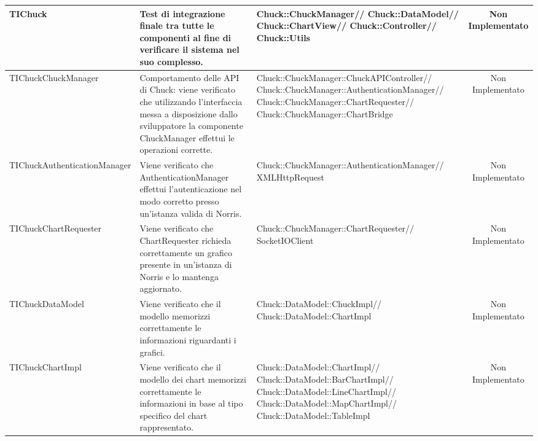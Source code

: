 \begin{table}[H]
\begin{center}
\begin{tabu}{| l | l | l | c |}


	TIChuck
				&
Test di integrazione finale tra tutte le componenti al fine di verificare il sistema nel suo complesso.
			& \parbox[t]{0.4\textwidth}{
Chuck::ChuckManager//
Chuck::DataModel//
Chuck::ChartView//
Chuck::Controller//
Chuck::Utils}
			& Non Implementato
			\\ \hline



	TIChuckChuckManager
				&
Comportamento delle API di Chuck: viene verificato che utilizzando l'interfaccia messa a disposizione dallo sviluppatore la componente ChuckManager effettui le operazioni corrette.
			& \parbox[t]{0.4\textwidth}{
Chuck::ChuckManager::ChuckAPIController//
Chuck::ChuckManager::AuthenticationManager//
Chuck::ChuckManager::ChartRequester//
Chuck::ChuckManager::ChartBridge}
			& Non Implementato
			\\ \hline


	
	TIChuckAuthenticationManager
				&
Viene verificato che AuthenticationManager effettui l'autenticazione nel modo corretto presso un'istanza valida di Norris.
			& \parbox[t]{0.4\textwidth}{
Chuck::ChuckManager::AuthenticationManager//
XMLHttpRequest}
			& Non Implementato
			\\ \hline



	TIChuckChartRequester
				&
Viene verificato che ChartRequester richieda correttamente un grafico presente in un'istanza di Norris e lo mantenga aggiornato.
			& \parbox[t]{0.4\textwidth}{
Chuck::ChuckManager::ChartRequester//
SocketIOClient}
			& Non Implementato
			\\ \hline



	TIChuckDataModel
				&
Viene verificato che il modello memorizzi correttamente le informazioni riguardanti i grafici.
			& \parbox[t]{0.4\textwidth}{
Chuck::DataModel::ChuckImpl//
Chuck::DataModel::ChartImpl}
			& Non Implementato
			\\ \hline



	TIChuckChartImpl
				&
Viene verificato che il modello dei chart memorizzi correttamente le informazioni in base al tipo specifico del chart rappresentato.
			& \parbox[t]{0.4\textwidth}{
Chuck::DataModel::ChartImpl//
Chuck::DataModel::BarChartImpl//
Chuck::DataModel::LineChartImpl//
Chuck::DataModel::MapChartImpl//
Chuck::DataModel::TableImpl}
			& Non Implementato
			\\ \hline




\end{tabu}
\end{center}
\end{table}
